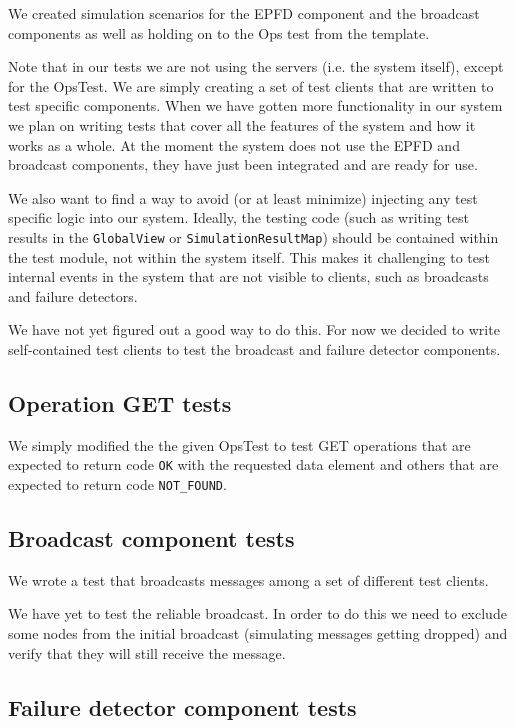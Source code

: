 \documentclass[a4paper, 11pt]{article}
\begin{document}
We created simulation scenarios for the EPFD component and the broadcast components as well as holding on to the Ops test from the template.

Note that in our tests we are not using the servers (i.e. the system itself), except for the OpsTest. We are simply creating a set of test clients that are written to test specific components. When we have gotten more functionality in our system we plan on writing tests that cover all the features of the system and how it works as a whole. At the moment the system does not use the EPFD and broadcast components, they have just been integrated and are ready for use.

We also want to find a way to avoid (or at least minimize) injecting any test specific logic into our system. Ideally, the testing code (such as writing test results in the \texttt{GlobalView} or \texttt{SimulationResultMap}) should be contained within the test module, not within the system itself. This makes it challenging to test internal events in the system that are not visible to clients, such as broadcasts and failure detectors.

We have not yet figured out a good way to do this. For now we decided to write self-contained test clients to test the broadcast and failure detector components.

\subsection{Operation GET tests}

We simply modified the the given OpsTest to test GET operations that are expected to return code \texttt{OK} with the requested data element and others that are expected to return code \texttt{NOT\_FOUND}.

\subsection{Broadcast component tests}

We wrote a test that broadcasts messages among a set of different test clients.

We have yet to test the reliable broadcast. In order to do this we need to exclude some nodes from the initial broadcast (simulating messages getting dropped) and verify that they will still receive the message.

\subsection{Failure detector component tests}
\end{document}
